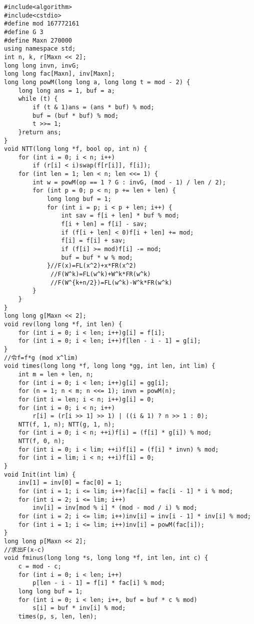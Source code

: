 \begin{verbatim}
#include<algorithm>
#include<cstdio>
#define mod 167772161
#define G 3
#define Maxn 270000
using namespace std;
int n, k, r[Maxn << 2];
long long invn, invG;
long long fac[Maxn], inv[Maxn];
long long powM(long long a, long long t = mod - 2) {
    long long ans = 1, buf = a;
    while (t) {
        if (t & 1)ans = (ans * buf) % mod;
        buf = (buf * buf) % mod;
        t >>= 1;
    }return ans;
}
void NTT(long long *f, bool op, int n) {
    for (int i = 0; i < n; i++)
        if (r[i] < i)swap(f[r[i]], f[i]);
    for (int len = 1; len < n; len <<= 1) {
        int w = powM(op == 1 ? G : invG, (mod - 1) / len / 2);
        for (int p = 0; p < n; p += len + len) {
            long long buf = 1;
            for (int i = p; i < p + len; i++) {
                int sav = f[i + len] * buf % mod;
                f[i + len] = f[i] - sav;
                if (f[i + len] < 0)f[i + len] += mod;
                f[i] = f[i] + sav;
                if (f[i] >= mod)f[i] -= mod;
                buf = buf * w % mod;
            }//F(x)=FL(x^2)+x*FR(x^2)
             //F(W^k)=FL(w^k)+W^k*FR(w^k)
             //F(W^{k+n/2})=FL(w^k)-W^k*FR(w^k)
        }
    }
}
long long g[Maxn << 2];
void rev(long long *f, int len) {
    for (int i = 0; i < len; i++)g[i] = f[i];
    for (int i = 0; i < len; i++)f[len - i - 1] = g[i];
}
//令f=f*g (mod x^lim) 
void times(long long *f, long long *gg, int len, int lim) {
    int m = len + len, n;
    for (int i = 0; i < len; i++)g[i] = gg[i];
    for (n = 1; n < m; n <<= 1); invn = powM(n);
    for (int i = len; i < n; i++)g[i] = 0;
    for (int i = 0; i < n; i++)
        r[i] = (r[i >> 1] >> 1) | ((i & 1) ? n >> 1 : 0);
    NTT(f, 1, n); NTT(g, 1, n);
    for (int i = 0; i < n; ++i)f[i] = (f[i] * g[i]) % mod;
    NTT(f, 0, n);
    for (int i = 0; i < lim; ++i)f[i] = (f[i] * invn) % mod;
    for (int i = lim; i < n; ++i)f[i] = 0;
}
void Init(int lim) {
    inv[1] = inv[0] = fac[0] = 1;
    for (int i = 1; i <= lim; i++)fac[i] = fac[i - 1] * i % mod;
    for (int i = 2; i <= lim; i++)
        inv[i] = inv[mod % i] * (mod - mod / i) % mod;
    for (int i = 2; i <= lim; i++)inv[i] = inv[i - 1] * inv[i] % mod;
    for (int i = 1; i <= lim; i++)inv[i] = powM(fac[i]);
}
long long p[Maxn << 2];
//求出F(x-c) 
void fminus(long long *s, long long *f, int len, int c) {
    c = mod - c;
    for (int i = 0; i < len; i++)
        p[len - i - 1] = f[i] * fac[i] % mod;
    long long buf = 1;
    for (int i = 0; i < len; i++, buf = buf * c % mod)
        s[i] = buf * inv[i] % mod;
    times(p, s, len, len);

\end{verbatim}
